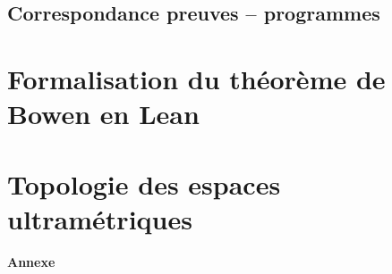 \documentclass[a4paper, 11pt, twoside]{article}
\begin{document}
    \subsection{Correspondance preuves -- programmes}
      

  \newpage
  \section{Formalisation du théorème de Bowen en Lean}
    

  \newpage
  \section{Topologie des espaces ultramétriques}
    

  \newpage
  \nocite{*}
  \thispagestyle{plain}
  \printbibliography[heading=bibintoc, title={Bibliographie}]

  \clearpage
  \thispagestyle{empty}
  \vspace*{5cm}
  \begin{center}
    \huge\textbf{Annexe}
  \end{center}
  \clearpage

  

\end{document}
